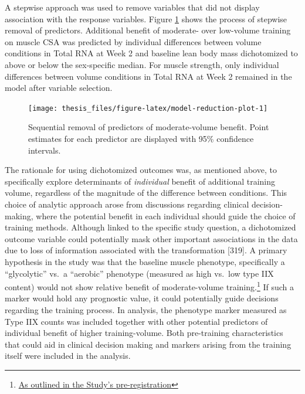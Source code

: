 \documentclass[twoside,10pt]{gihclass} %
\begin{document}
A stepwise approach was used to remove variables that did not display association with the response variables. Figure \ref{fig:model-reduction-plot} shows the process of stepwise removal of predictors.
Additional benefit of moderate- over low-volume training on muscle CSA was predicted by individual differences between volume conditions in Total RNA at Week 2 and baseline lean body mass dichotomized to above or below the sex-specific median.
For muscle strength, only individual differences between volume conditions in Total RNA at Week 2 remained in the model after variable selection.
\begin{figure}

{\centering \texttt{[image: thesis\_files/figure-latex/model-reduction-plot-1]} 

}

\caption[Step-wise variable selection of determinants of moderate- over low-volume training benefit.]{Sequential removal of predictors of moderate-volume benefit. Point estimates for each predictor are displayed with 95\% confidence intervals.}\label{fig:model-reduction-plot}
\end{figure}
The rationale for using dichotomized outcomes was, as mentioned above, to specifically explore determinants of \emph{individual} benefit of additional training volume, regardless of the magnitude of the difference between conditions.
This choice of analytic approach arose from discussions regarding clinical decision-making, where the potential benefit in each individual should guide the choice of training methods.
Although linked to the specific study question, a dichotomized outcome variable could potentially mask other important associations in the data due to loss of information associated with the transformation
{[}319{]}.
A primary hypothesis in the study was that the baseline muscle phenotype, specifically a ``glycolytic'' vs.~a ``aerobic'' phenotype (measured as high vs.~low type IIX content) would not show relative benefit of moderate-volume training.\footnote{\href{https://clinicaltrials.gov/ct2/show/NCT02179307?term=lillehammer\&draw=2\&rank=9}{As outlined in the Study's pre-registration}}
If such a marker would hold any prognostic value, it could potentially guide decisions regarding the training process.
In analysis, the phenotype marker measured as Type IIX counts was included together with other potential predictors of individual benefit of higher training-volume.
Both pre-training characteristics that could aid in clinical decision making and markers arising from the training itself were included in the analysis.
\end{document}
